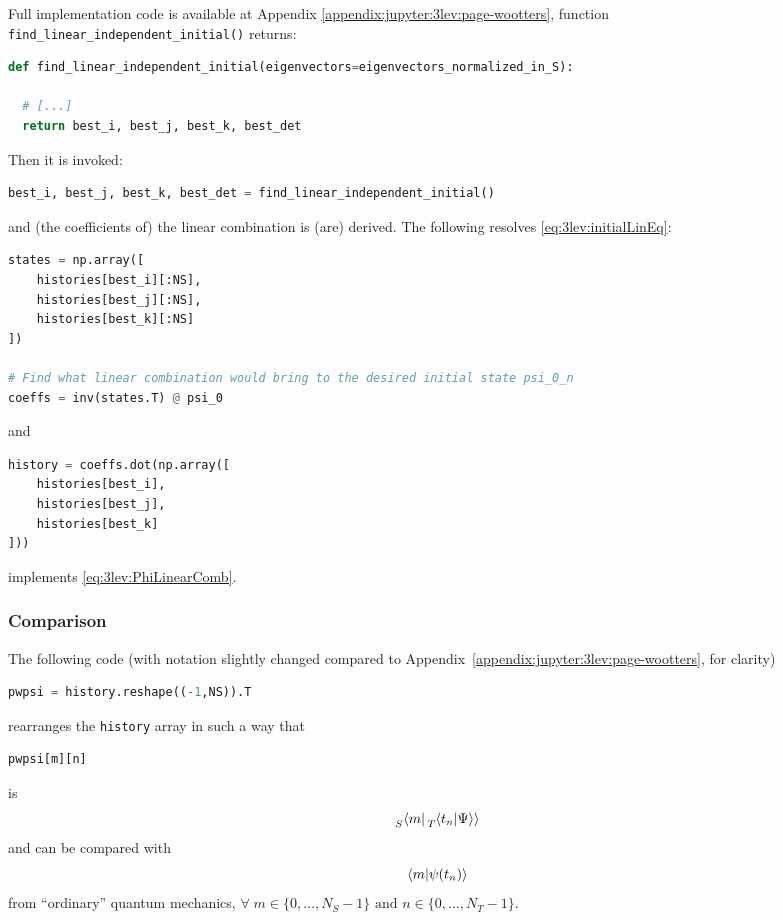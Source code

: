 Full implementation code is available at Appendix
\ref{appendix:jupyter:3lev:page-wootters},
function \\
\Verb#find_linear_independent_initial()#
returns:
\begin{lstlisting}[language=Python]
def find_linear_independent_initial(eigenvectors=eigenvectors_normalized_in_S):

  # [...]
  return best_i, best_j, best_k, best_det
\end{lstlisting}
Then it is invoked:
\begin{lstlisting}[language=Python]
best_i, best_j, best_k, best_det = find_linear_independent_initial()
\end{lstlisting}
and (the coefficients of) the linear combination is (are) derived.
The following resolves \eqref{eq:3lev:initialLinEq}:
\begin{lstlisting}[language=Python]
states = np.array([
    histories[best_i][:NS],
    histories[best_j][:NS],
    histories[best_k][:NS]
])

# Find what linear combination would bring to the desired initial state psi_0_n
coeffs = inv(states.T) @ psi_0
\end{lstlisting}
and
\begin{lstlisting}[language=Python]
history = coeffs.dot(np.array([
    histories[best_i],
    histories[best_j],
    histories[best_k]
]))
\end{lstlisting}
implements \eqref{eq:3lev:PhiLinearComb}.

\subsubsection*{Comparison}

The following code
(with notation slightly changed compared to Appendix~\ref{appendix:jupyter:3lev:page-wootters}, for clarity)
\begin{lstlisting}[language=Python]
pwpsi = history.reshape((-1,NS)).T
\end{lstlisting}
rearranges the \Verb!history! array in such a way that
\begin{lstlisting}[language=Python]
pwpsi[m][n]
\end{lstlisting}
is
\begin{equation*}
\prescript{}{S}{\bra{m}} \prescript{}{T}{\!\left.\left\langle t_n \middle| \Psi \right\rangle\right\rangle}
\end{equation*}
and can be compared with
\begin{equation*}
  \braket{m}{\psi(t_n)}
\end{equation*}
from ``ordinary'' quantum mechanics, $
  \forall \; m \in \{0, \dots, N_S - 1\} \text{ and } n \in \{0, \dots, N_T - 1\}
$.

